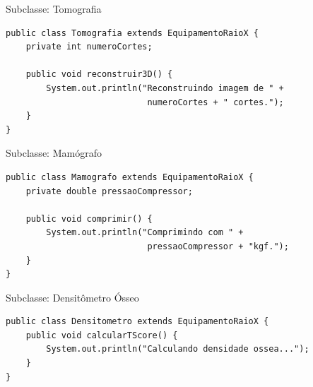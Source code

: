 \documentclass[9pt]{beamer}
\begin{document}
\begin{frame}[fragile]{Subclasse: Tomografia}
\begin{lstlisting}
public class Tomografia extends EquipamentoRaioX {
    private int numeroCortes;

    public void reconstruir3D() {
        System.out.println("Reconstruindo imagem de " + 
                            numeroCortes + " cortes.");
    }
}
\end{lstlisting}
\end{frame}

\begin{frame}[fragile]{Subclasse: Mamógrafo}
\begin{lstlisting}
public class Mamografo extends EquipamentoRaioX {
    private double pressaoCompressor;

    public void comprimir() {
        System.out.println("Comprimindo com " + 
                            pressaoCompressor + "kgf.");
    }
}
\end{lstlisting}
\end{frame}

\begin{frame}[fragile]{Subclasse: Densitômetro Ósseo}
\begin{lstlisting}
public class Densitometro extends EquipamentoRaioX {
    public void calcularTScore() {
        System.out.println("Calculando densidade ossea...");
    }
}
\end{lstlisting}
\end{frame}
\end{document}
